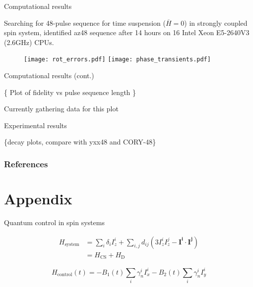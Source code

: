 \documentclass{beamer}
\begin{document}
\begin{frame}{Computational results}


Searching for 48-pulse sequence for time suspension (\(\overline{H}=0\)) in strongly coupled spin system, identified \textrm{az48} sequence after 14 hours
on 16 Intel Xeon E5-2640V3 (2.6GHz) CPUs.

\begin{figure}
\centering
\texttt{[image: rot\_errors.pdf]}
\texttt{[image: phase\_transients.pdf]}
\end{figure}

\end{frame}

\begin{frame}{Computational results (cont.)}

\{ Plot of fidelity vs pulse sequence length \}

Currently gathering data for this plot

\end{frame}

\begin{frame}{Experimental results}

\{decay plots, compare with yxx48 and CORY-48\}


\end{frame}

\begin{frame}[allowframebreaks]
\frametitle{References}

\printbibliography

\end{frame}
















\section{Appendix}


\begin{frame}{Quantum control in spin systems}


\begin{align*}
    H_\text{system} &= \sum_i \delta_i I_z^i + \sum_{i,j} d_{ij} \left( 3I_z^iI_z^j - \mathbf{I^i} \cdot \mathbf{I^j} \right) \\
        &= H_\text{CS} + H_\text{D}
\end{align*}

\[
    H_\text{control}(t) = -B_1(t) \sum_i \gamma_n^i I_x^i -B_2(t) \sum_i \gamma_n^i I_y^i
\]

\end{frame}
\end{document}
